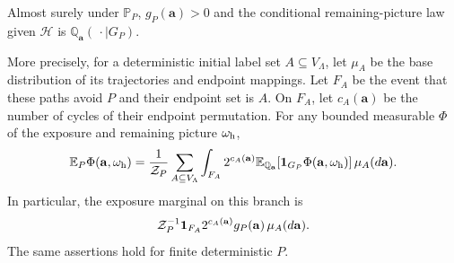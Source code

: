 \begin{proposition}\label{prop:exposure}
Almost surely under $\mathbb P_P$, $g_P(\mathbf a)>0$ and the
conditional remaining-picture law given $\mathscr H$ is
$\mathbb Q_{\mathbf a}(\,\cdot\mid G_P)$.

More precisely, for a deterministic initial label set
$A\subseteq V_\Lambda$, let $\mu_A$ be the base distribution of
its trajectories and endpoint mappings.  Let $F_A$ be the event
that these paths avoid $P$ and their endpoint set is $A$.  On $F_A$,
let $c_A(\mathbf a)$ be the number of cycles of their endpoint
permutation.  For any bounded measurable $\Phi$ of the exposure
and remaining picture $\omega_{\rm h}$,
\begin{equation}\label{eq:exposure-disintegration}
 \mathbb E_P\Phi(\mathbf a,\omega_{\rm h})
 =\frac1{\mathcal Z_P}\sum_{A\subseteq V_\Lambda}
     \int_{F_A}2^{c_A(\mathbf a)}
        \mathbb E_{\mathbb Q_{\mathbf a}}
                 [\mathbf1_{G_P}\Phi(\mathbf a,\omega_{\rm h})]
                                            \,\mu_A(d\mathbf a).
\end{equation}
In particular, the exposure marginal on this branch is
\begin{equation}\label{eq:exposure-marginal}
 \mathcal Z_P^{-1}\mathbf1_{F_A}2^{c_A(\mathbf a)}g_P(\mathbf a)
                                                   \,\mu_A(d\mathbf a).
\end{equation}
The same assertions hold for finite deterministic $P$.
\end{proposition}

